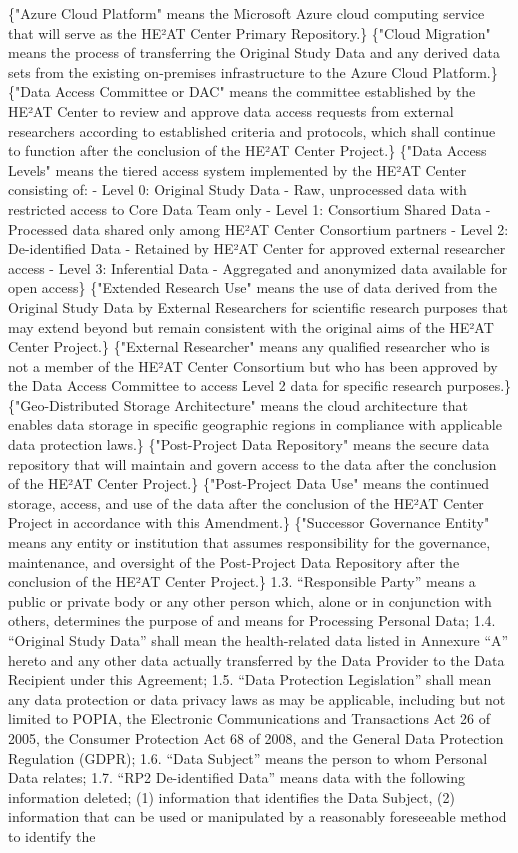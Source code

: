 \documentclass[12pt,letterpaper]{article}
\newcommand{\added}[1]{\textcolor{addcolor}{#1}}
\begin{document}
\added\{"Azure Cloud Platform" means the Microsoft Azure cloud computing service that will serve as the HE²AT Center Primary Repository.\} \added\{"Cloud Migration" means the process of transferring the Original Study Data and any derived data sets from the existing on-premises infrastructure to the Azure Cloud Platform.\} \added\{"Data Access Committee or DAC" means the committee established by the HE²AT Center to review and approve data access requests from external researchers according to established criteria and protocols, which shall continue to function after the conclusion of the HE²AT Center Project.\} \added\{"Data Access Levels" means the tiered access system implemented by the HE²AT Center consisting of: - Level 0: Original Study Data - Raw, unprocessed data with restricted access to Core Data Team only - Level 1: Consortium Shared Data - Processed data shared only among HE²AT Center Consortium partners - Level 2: De-identified Data - Retained by HE²AT Center for approved external researcher access - Level 3: Inferential Data - Aggregated and anonymized data available for open access\} \added\{"Extended Research Use" means the use of data derived from the Original Study Data by External Researchers for scientific research purposes that may extend beyond but remain consistent with the original aims of the HE²AT Center Project.\} \added\{"External Researcher" means any qualified researcher who is not a member of the HE²AT Center Consortium but who has been approved by the Data Access Committee to access Level 2 data for specific research purposes.\} \added\{"Geo-Distributed Storage Architecture" means the cloud architecture that enables data storage in specific geographic regions in compliance with applicable data protection laws.\} \added\{"Post-Project Data Repository" means the secure data repository that will maintain and govern access to the data after the conclusion of the HE²AT Center Project.\} \added\{"Post-Project Data Use" means the continued storage, access, and use of the data after the conclusion of the HE²AT Center Project in accordance with this Amendment.\} \added\{"Successor Governance Entity" means any entity or institution that assumes responsibility for the governance, maintenance, and oversight of the Post-Project Data Repository after the conclusion of the HE²AT Center Project.\} 1.3.	“Responsible Party” means a public or private body or any other person which, alone or in conjunction with others, determines the purpose of and means for Processing Personal Data; 1.4.	“Original Study Data” shall mean the health-related data listed in Annexure “A” hereto and any other data actually transferred by the Data Provider to the Data Recipient under this Agreement;   1.5.	“Data Protection Legislation” shall mean any data protection or data privacy laws as may be applicable, including but not limited to POPIA, the Electronic Communications and Transactions Act 26 of 2005, the Consumer Protection Act 68 of 2008, and the General Data Protection Regulation (GDPR); 1.6.	“Data Subject” means the person to whom Personal Data relates; 1.7.	“RP2 De-identified Data” means data with the following information deleted; (1) information that identifies the Data Subject, (2) information that can be used or manipulated by a reasonably foreseeable method to identify the 
\end{document}
